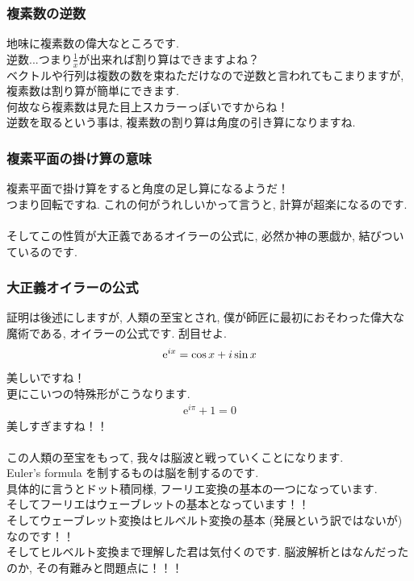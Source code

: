 \documentclass[11pt,a4paper]{jreport}
\begin{document}
\subsubsection{複素数の逆数}
地味に複素数の偉大なところです.\\
逆数...つまり$\frac{1}{x}$が出来れば割り算はできますよね？\\
ベクトルや行列は複数の数を束ねただけなので逆数と言われてもこまりますが, 複素数は割り算が簡単にできます. \\
何故なら複素数は見た目上スカラーっぽいですからね！\\
逆数を取るという事は, 複素数の割り算は角度の引き算になりますね.\\

\subsubsection{複素平面の掛け算の意味}
複素平面で掛け算をすると角度の足し算になるようだ！\\
つまり回転ですね. これの何がうれしいかって言うと, 計算が超楽になるのです.\\
\\

そしてこの性質が大正義であるオイラーの公式に, 必然か神の悪戯か, 結びついているのです.
\subsubsection{大正義オイラーの公式}
証明は後述にしますが, 人類の至宝とされ, 僕が師匠に最初におそわった偉大な魔術である, オイラーの公式です. 刮目せよ.\\
\begin{eqnarray}
\mathrm{e}^{ix} = \cos x + \mathstrut i\sin x
\label{eq:euler}
\end{eqnarray}
美しいですね！\\
更にこいつの特殊形がこうなります.\\
\begin{eqnarray}
\mathrm{e}^{i\pi} + 1 = 0
\end{eqnarray}
美しすぎますね！！\\
\\
この人類の至宝をもって, 我々は脳波と戦っていくことになります.\\
Euler's formula を制するものは脳を制するのです.\\
具体的に言うとドット積同様, フーリエ変換の基本の一つになっています. \\
そしてフーリエはウェーブレットの基本となっています！！\\
そしてウェーブレット変換はヒルベルト変換の基本 (発展という訳ではないが) なのです！！\\
そしてヒルベルト変換まで理解した君は気付くのです. 脳波解析とはなんだったのか, その有難みと問題点に！！！\\
\end{document}
